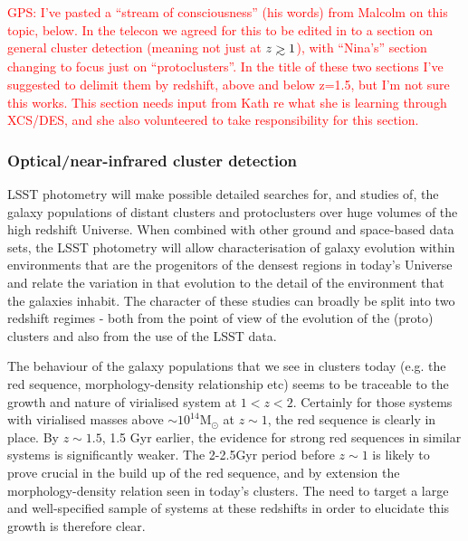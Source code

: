\documentclass[a4paper,11pt]{article}
\newcommand{\red}{\textcolor{red}}
\def\gs{\mathrel{\hbox{\rlap{\hbox{\lower4pt\hbox{$\sim$}}}\hbox{$>$}}}}
\begin{document}
\noindent\red{GPS: I've pasted a ``stream of consciousness'' (his
  words) from Malcolm on this topic, below.  In the telecon we agreed
  for this to be edited in to a section on general cluster detection
  (meaning not just at $z\gs1$), with ``Nina's'' section changing to
  focus just on ``protoclusters''.  In the title of these two sections
  I've suggested to delimit them by redshift, above and below z=1.5,
  but I'm not sure this works.  This section needs input from Kath re
  what she is learning through XCS/DES, and she also volunteered to
  take responsibility for this section.}

\subsubsection*{Optical/near-infrared cluster detection}

\noindent LSST photometry will make possible detailed searches for,
and studies of, the galaxy populations of distant clusters and
protoclusters over huge volumes of the high redshift Universe. When
combined with other ground and space-based data sets, the LSST
photometry will allow characterisation of galaxy evolution within
environments that are the progenitors of the densest regions in
today's Universe and relate the variation in that evolution to the
detail of the environment that the galaxies inhabit. The character of
these studies can broadly be split into two redshift regimes - both
from the point of view of the evolution of the (proto) clusters and
also from the use of the LSST data.

The behaviour of the galaxy populations that we see in clusters today
(e.g. the red sequence, morphology-density relationship etc) seems to
be traceable to the growth and nature of virialised system at
$1<z<2$. Certainly for those systems with virialised masses above
$\sim 10^{14}$M$_\odot$ at $z\sim 1$, the red sequence is clearly in
place. By $z\sim 1.5$, 1.5 Gyr earlier, the evidence for strong red
sequences in similar systems is significantly weaker. The 2-2.5Gyr
period before $z\sim 1$ is likely to prove crucial in the build up of
the red sequence, and by extension the morphology-density relation
seen in today's clusters. The need to target a large and
well-specified sample of systems at these redshifts in order to
elucidate this growth is therefore clear.
\end{document}
